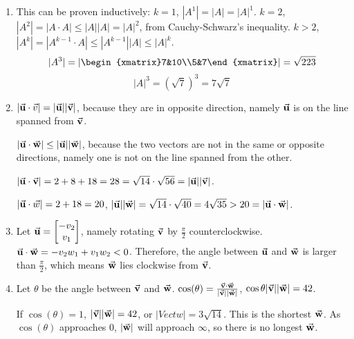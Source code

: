 \begin{exercise}{10}
  \begin{enumerate}
    \item This can be proven inductively: $k = 1$, $|A^1| = |A| = |A|^1$. $k = 2$, $|A^2| = |A \cdot A| \leq |A||A| = |A|^2$, from Cauchy-Schwarz's inequality. $k > 2$, $|A^k| = |A^{k-1} \cdot A| \leq |A^{k-1}||A| \leq |A|^k$. \rQED
          $$|A^3| = |\begin{xmatrix}7&10\\5&7\end{xmatrix}| = \sqrt{223}$$
          $$|A|^3 = (\sqrt{7})^3 = 7\sqrt{7}$$
          
    \item $|\vec{\mathbf{u}} \cdot \Vec{v}| = |\vec{\mathbf{u}}||\vec{\mathbf{v}}|$, because they are in opposite direction, namely $\vec{\mathbf{u}}$ is on the line spanned from $\vec{\mathbf{v}}$.
          
          $|\vec{\mathbf{u}} \cdot \vec{\mathbf{w}}| \leq |\vec{\mathbf{u}}||\vec{\mathbf{w}}|$, because the two vectors are not in the same or opposite directions, namely one is not on the line spanned from the other.
          
          $|\vec{\mathbf{u}} \cdot \vec{\mathbf{v}}| = 2 + 8 + 18 = 28 = \sqrt{14} \cdot \sqrt{56} = |\vec{\mathbf{u}}||\vec{\mathbf{v}}|$.
          
          $|\vec{\mathbf{u}} \cdot \Vec{w}| = 2 + 18 = 20$, $|\vec{\mathbf{u}}||\vec{\mathbf{w}}| = \sqrt{14} \cdot \sqrt{40} = 4\sqrt{35} > 20 = |\vec{\mathbf{u}} \cdot \vec{\mathbf{w}}|$.
    
    \item Let $\vec{\mathbf{u}} = \begin{bmatrix}-v_2\\v_1\end{bmatrix}$, namely rotating $\vec{\mathbf{v}}$ by $\frac{\pi}{2}$ counterclockwise. $\vec{\mathbf{u}} \cdot \vec{\mathbf{w}} = -v_2w_1 + v_1w_2 < 0$. Therefore, the angle between $\vec{\mathbf{u}}$ and $\vec{\mathbf{w}}$ is larger than $\frac{\pi}{2}$, which means $\vec{\mathbf{w}}$ lies clockwise from $\vec{\mathbf{v}}$.
    
    \item Let $\theta$ be the angle between $\vec{\mathbf{v}}$ and $\vec{\mathbf{w}}$. $\cos(\theta) = \frac{\vec{\mathbf{v}} \cdot \vec{\mathbf{w}}}{|\vec{\mathbf{v}}||\vec{\mathbf{w}}|}$, $\cos{\theta}|\vec{\mathbf{v}}||\vec{\mathbf{w}}| = 42$.
    
          If $\cos(\theta) = 1$, $|\vec{\mathbf{v}}||\vec{\mathbf{w}}| = 42$, or $|Vect{w}| = 3\sqrt{14}$. This is the shortest $\vec{\mathbf{w}}$. As $\cos(\theta)$ approaches $0$, $|\vec{\mathbf{w}}|$ will approach $\infty$, so there is no longest $\vec{\mathbf{w}}$.
  \end{enumerate}
\end{exercise}

